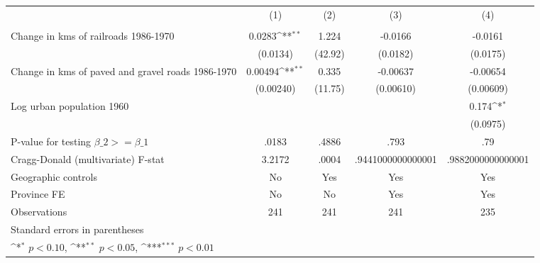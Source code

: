 {
\def\sym#1{\ifmmode^{#1}\else\(^{#1}\)\fi}
\begin{tabular}{l*{4}{c}}
\hline\hline
                &\multicolumn{1}{c}{(1)}&\multicolumn{1}{c}{(2)}&\multicolumn{1}{c}{(3)}&\multicolumn{1}{c}{(4)}\\
                &\multicolumn{1}{c}{}&\multicolumn{1}{c}{}&\multicolumn{1}{c}{}&\multicolumn{1}{c}{}\\
\hline
Change in kms of railroads 1986-1970&   0.0283\sym{**} &    1.224         &  -0.0166         &  -0.0161         \\
                & (0.0134)         &  (42.92)         & (0.0182)         & (0.0175)         \\
[1em]
Change in kms of paved and gravel roads 1986-1970&  0.00494\sym{**} &    0.335         & -0.00637         & -0.00654         \\
                &(0.00240)         &  (11.75)         &(0.00610)         &(0.00609)         \\
[1em]
Log urban population 1960&                  &                  &                  &    0.174\sym{*}  \\
                &                  &                  &                  & (0.0975)         \\
\hline
P-value for testing $\beta\_{2} >= \beta\_{1}$&    .0183         &    .4886         &     .793         &      .79         \\
Cragg-Donald (multivariate) F-stat&   3.2172         &    .0004         &.9441000000000001         &.9882000000000001         \\
Geographic controls&       No         &      Yes         &      Yes         &      Yes         \\
Province FE     &       No         &       No         &      Yes         &      Yes         \\
Observations    &      241         &      241         &      241         &      235         \\
\hline\hline
\multicolumn{5}{l}{\footnotesize Standard errors in parentheses}\\
\multicolumn{5}{l}{\footnotesize \sym{*} \(p<0.10\), \sym{**} \(p<0.05\), \sym{***} \(p<0.01\)}\\
\end{tabular}
}
